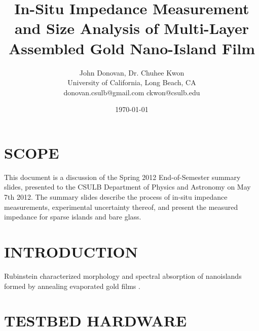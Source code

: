 \documentclass[12pt,oneside,english]{article}
\begin{document}
\title{In-Situ Impedance Measurement and Size Analysis of Multi-Layer Assembled Gold Nano-Island Film}

    \author{John Donovan, Dr. Chuhee Kwon\\
    University of California, Long Beach, CA\\
    {\small donovan.csulb@gmail.com ckwon@csulb.edu}}
    
        \date{\today}


    \maketitle

    \tableofcontents

\section{SCOPE}
    This document is a discussion of the Spring 2012 End-of-Semester summary slides, presented to the CSULB Department of Physics and Astronomy on May 7th 2012.
    The summary slides describe the process of in-situ impedance measurements, experimental uncertainty thereof, and present the measured impedance for sparse islands and bare glass.


\section{INTRODUCTION}

Rubinstein characterized morphology and spectral absorption of nanoislands formed by annealing evaporated gold films \cite{doron2004}.


\section{TESTBED HARDWARE}
\end{document}
